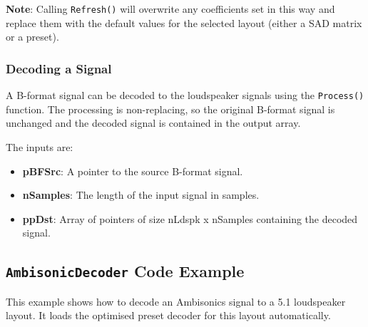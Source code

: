 \documentclass[12pt]{report}
\newcommand{\code}[1]{\texttt{#1}}
\begin{document}
\textbf{Note}: Calling \code{Refresh()} will overwrite any coefficients set in this way and replace them with the default values for the selected layout (either a SAD matrix or a preset).

\subsubsection{Decoding a Signal}

A B-format signal can be decoded to the loudspeaker signals using the \code{Process()} function. The processing is non-replacing, so the original B-format signal is unchanged and the decoded signal is contained in the output array.

The inputs are:
\begin{itemize}
    \item \textbf{pBFSrc}: A pointer to the source B-format signal.
    \item \textbf{nSamples}: The length of the input signal in samples.
    \item \textbf{ppDst}: Array of pointers of size nLdspk x nSamples containing the decoded signal.
\end{itemize}

\subsection{\code{AmbisonicDecoder} Code Example}

This example shows how to decode an Ambisonics signal to a 5.1 loudspeaker layout. It loads the optimised preset decoder for this layout automatically.
\end{document}
